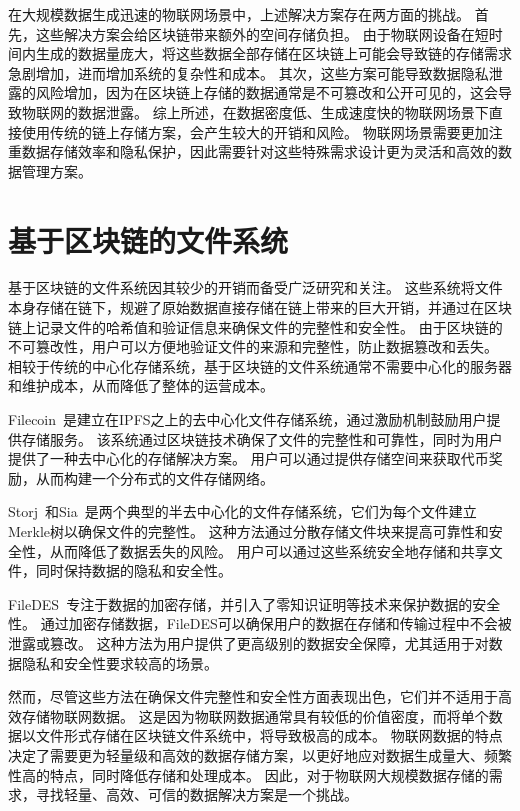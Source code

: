 在大规模数据生成迅速的物联网场景中，上述解决方案存在两方面的挑战。
首先，这些解决方案会给区块链带来额外的空间存储负担。
由于物联网设备在短时间内生成的数据量庞大，将这些数据全部存储在区块链上可能会导致链的存储需求急剧增加，进而增加系统的复杂性和成本。
其次，这些方案可能导致数据隐私泄露的风险增加，因为在区块链上存储的数据通常是不可篡改和公开可见的，这会导致物联网的数据泄露。
综上所述，在数据密度低、生成速度快的物联网场景下直接使用传统的链上存储方案，会产生较大的开销和风险。
物联网场景需要更加注重数据存储效率和隐私保护，因此需要针对这些特殊需求设计更为灵活和高效的数据管理方案。

\section{基于区块链的文件系统}
基于区块链的文件系统因其较少的开销而备受广泛研究和关注。
这些系统将文件本身存储在链下，规避了原始数据直接存储在链上带来的巨大开销，并通过在区块链上记录文件的哈希值和验证信息来确保文件的完整性和安全性。
由于区块链的不可篡改性，用户可以方便地验证文件的来源和完整性，防止数据篡改和丢失。
相较于传统的中心化存储系统，基于区块链的文件系统通常不需要中心化的服务器和维护成本，从而降低了整体的运营成本。

Filecoin~\cite{bauer2022filecoin}是建立在IPFS之上的去中心化文件存储系统，通过激励机制鼓励用户提供存储服务。
该系统通过区块链技术确保了文件的完整性和可靠性，同时为用户提供了一种去中心化的存储解决方案。
用户可以通过提供存储空间来获取代币奖励，从而构建一个分布式的文件存储网络。

Storj~\cite{storj2018storj}和Sia~\cite{vorick2014sia}是两个典型的半去中心化的文件存储系统，它们为每个文件建立Merkle树以确保文件的完整性。
这种方法通过分散存储文件块来提高可靠性和安全性，从而降低了数据丢失的风险。
用户可以通过这些系统安全地存储和共享文件，同时保持数据的隐私和安全性。

FileDES~\cite{xu2024filedes}专注于数据的加密存储，并引入了零知识证明等技术来保护数据的安全性。
通过加密存储数据，FileDES可以确保用户的数据在存储和传输过程中不会被泄露或篡改。
这种方法为用户提供了更高级别的数据安全保障，尤其适用于对数据隐私和安全性要求较高的场景。

然而，尽管这些方法在确保文件完整性和安全性方面表现出色，它们并不适用于高效存储物联网数据。
这是因为物联网数据通常具有较低的价值密度，而将单个数据以文件形式存储在区块链文件系统中，将导致极高的成本。
物联网数据的特点决定了需要更为轻量级和高效的数据存储方案，以更好地应对数据生成量大、频繁性高的特点，同时降低存储和处理成本。
因此，对于物联网大规模数据存储的需求，寻找轻量、高效、可信的数据解决方案是一个挑战。


